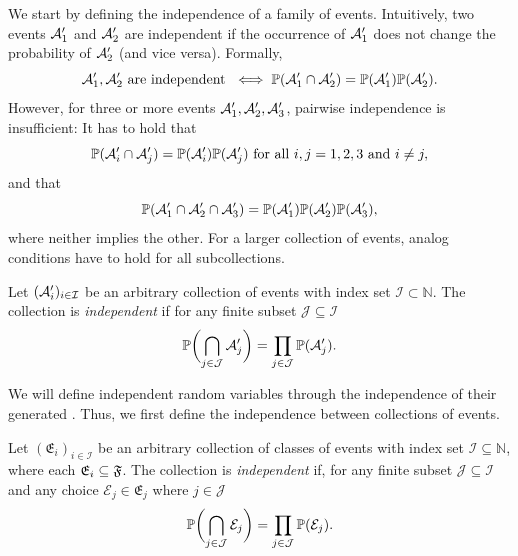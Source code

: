 We start by defining the independence of a family of events.
Intuitively, two events \( \mathcal{A}^\prime_{\num{1}} \) and \( \mathcal{A}^\prime_{\num{2}} \) are independent if the occurrence of \( \mathcal{A}^\prime_{\num{1}} \) does not change the probability of \( \mathcal{A}^\prime_{\num{2}} \) (and vice versa).
Formally,
\begin{equation}
	\mathcal{A}^\prime_{\num{1}}, \mathcal{A}^\prime_{\num{2}}\ \text{are independent}\ \iff \mathbb{P}(\mathcal{A}^\prime_{\num{1}} \cap \mathcal{A}^\prime_{\num{2}}) = \mathbb{P}(\mathcal{A}^\prime_{\num{1}})\mathbb{P}(\mathcal{A}^\prime_{\num{2}}).
\end{equation}
However, for three or more events \( \mathcal{A}^\prime_{\num{1}}, \mathcal{A}^\prime_{\num{2}}, \mathcal{A}^\prime_{\num{3}} \), pairwise independence is insufficient:
It has to hold that
\begin{equation}
	\mathbb{P}(\mathcal{A}^\prime_i \cap \mathcal{A}^\prime_j) = \mathbb{P}(\mathcal{A}^\prime_i) \mathbb{P}(\mathcal{A}^\prime_j)\ \text{for all}\ i, j = \num{1},\num{2},\num{3}\ \text{and}\ i \neq j,
\end{equation}
and that
\begin{equation}
	\mathbb{P}(\mathcal{A}^\prime_{\num{1}} \cap \mathcal{A}^\prime_{\num{2}} \cap \mathcal{A}^\prime_{\num{3}}) = \mathbb{P}(\mathcal{A}^\prime_{\num{1}})\mathbb{P}(\mathcal{A}^\prime_{\num{2}})\mathbb{P}(\mathcal{A}^\prime_{\num{3}}),
\end{equation}
where neither implies the other.
For a larger collection of events, analog conditions have to hold for all subcollections.
\begin{definition}%
	\label{def:independence of events}
	Let \( (\mathcal{A}^\prime_i)_{i\in\mathcal{I}} \) be an arbitrary collection of events with index set \( \mathcal{I} \subset \mathbb{N} \).
	The collection is \emph{independent} if for any finite subset \( \mathcal{J} \subseteq \mathcal{I} \)
	\begin{equation}
		\mathbb{P}\biggl( \bigcap_{j \in \mathcal{J}} \mathcal{A}^\prime_j \biggr) =  \prod_{j\in\mathcal{J}}\mathbb{P}(\mathcal{A}^\prime_j).
	\end{equation}
\end{definition}
We will define independent random variables through the independence of their generated \SigmaAlgebras.
Thus, we first define the independence between collections of events.
\begin{definition}%
	\label{def:independence of classes of events}
	Let \( (\mathfrak{E}_i)_{i\in\mathcal{I}} \) be an arbitrary collection of classes of events with index set \( \mathcal{I} \subseteq \mathbb{N} \), where each \( \mathfrak{E}_i \subseteq \mathfrak{F} \).
	The collection is \emph{independent} if, for any finite subset \( \mathcal{J} \subseteq \mathcal{I} \) and any choice \( \mathcal{E}_j \in \mathfrak{E}_j \) where \( j \in \mathcal{J} \)
	\begin{equation}
		\mathbb{P}\biggl( \bigcap_{j\in\mathcal{J}}\mathcal{E}_j \biggr) = \prod_{j\in\mathcal{J}} \mathbb{P}(\mathcal{E}_j).
	\end{equation}
\end{definition}
